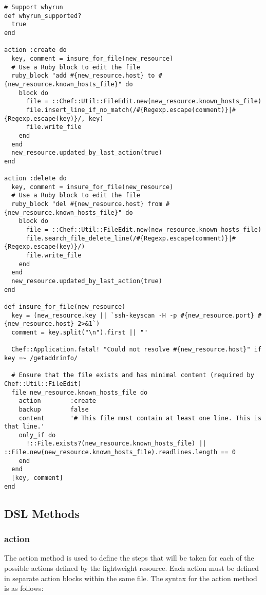 \begin{lstlisting}[label=lst:cookbook-lwrp4,title=my-server-cloud/site-cookbooks/my\_cool\_app/providers/know\_host.rb]
# Support whyrun
def whyrun_supported?
  true
end

action :create do
  key, comment = insure_for_file(new_resource)
  # Use a Ruby block to edit the file
  ruby_block "add #{new_resource.host} to #{new_resource.known_hosts_file}" do
    block do
      file = ::Chef::Util::FileEdit.new(new_resource.known_hosts_file)
      file.insert_line_if_no_match(/#{Regexp.escape(comment)}|#{Regexp.escape(key)}/, key)
      file.write_file
    end
  end
  new_resource.updated_by_last_action(true)
end

action :delete do
  key, comment = insure_for_file(new_resource)
  # Use a Ruby block to edit the file
  ruby_block "del #{new_resource.host} from #{new_resource.known_hosts_file}" do
    block do
      file = ::Chef::Util::FileEdit.new(new_resource.known_hosts_file)
      file.search_file_delete_line(/#{Regexp.escape(comment)}|#{Regexp.escape(key)}/)
      file.write_file
    end
  end
  new_resource.updated_by_last_action(true)
end

def insure_for_file(new_resource)
  key = (new_resource.key || `ssh-keyscan -H -p #{new_resource.port} #{new_resource.host} 2>&1`)
  comment = key.split("\n").first || ""

  Chef::Application.fatal! "Could not resolve #{new_resource.host}" if key =~ /getaddrinfo/

  # Ensure that the file exists and has minimal content (required by Chef::Util::FileEdit)
  file new_resource.known_hosts_file do
    action        :create
    backup        false
    content       '# This file must contain at least one line. This is that line.'
    only_if do
      !::File.exists?(new_resource.known_hosts_file) || ::File.new(new_resource.known_hosts_file).readlines.length == 0
    end
  end
  [key, comment]
end
\end{lstlisting}

\subsection{DSL Methods}

\subsubsection{action}

The action method is used to define the steps that will be taken for each of the possible actions defined by the lightweight resource. Each action must be defined in separate action blocks within the same file. The syntax for the action method is as follows:

